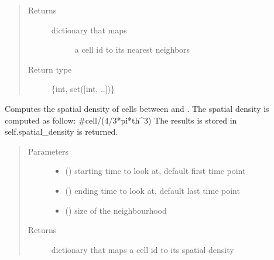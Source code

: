\documentclass[letterpaper,10pt,english]{sphinxmanual}
\begin{document}
\begin{fulllineitems}
\begin{fulllineitems}
\begin{quote}
\begin{description}
\item[{Returns}] \leavevmode
\begin{description}
\item[{dictionary that maps}] \leavevmode
a cell id to its  nearest neighbors

\end{description}


\item[{Return type}] \leavevmode
\{int, set({[}int, ..{]})\}

\end{description}\end{quote}

\end{fulllineitems}


\begin{fulllineitems}
\label{\detokenize{index:LineageTree.lineageTree.compute_spatial_density}}
Computes the spatial density of cells between  and .
The spatial density is computed as follow:
\#cell/(4/3*pi*th\textasciicircum{}3)
The results is stored in self.spatial\_density is returned.
\begin{quote}\begin{description}
\item[{Parameters}] \leavevmode\begin{itemize}
\item {} 
 () \textendash{} starting time to look at, default first time point

\item {} 
 () \textendash{} ending time to look at, default last time point

\item {} 
 () \textendash{} size of the neighbourhood

\end{itemize}

\item[{Returns}] \leavevmode
dictionary that maps a cell id to its spatial density


\end{description}
\end{quote}
\end{fulllineitems}
\end{fulllineitems}
\end{document}
